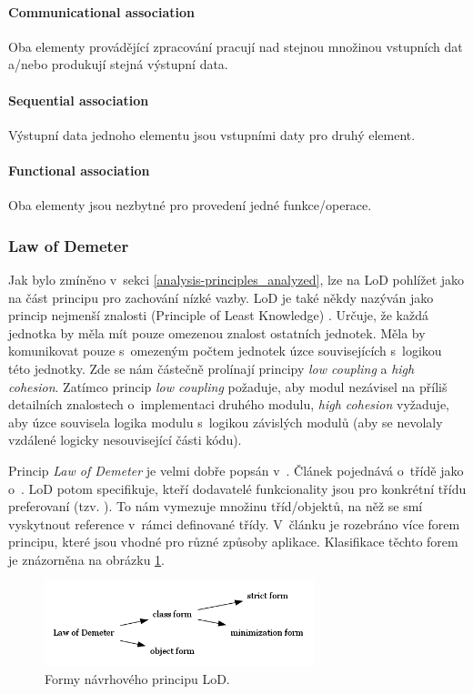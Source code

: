 \paragraph{Communicational association} Oba elementy provádějící zpracování pracují nad stejnou množinou vstupních dat a/nebo produkují stejná výstupní data.

\paragraph{Sequential association} Výstupní data jednoho elementu jsou vstupními daty pro druhý element.

\paragraph{Functional association} Oba elementy jsou nezbytné pro provedení jedné funkce/operace.

\subsubsection{Law of Demeter}
Jak bylo zmíněno v~sekci \ref{analysis-principles_analyzed}, lze na LoD pohlížet jako na část principu pro zachování nízké vazby. LoD je také někdy nazýván jako princip nejmenší znalosti (Principle of Least Knowledge) \cite{wiki:lod}. Určuje, že každá jednotka by měla mít pouze omezenou znalost ostatních jednotek. Měla by komunikovat pouze s~omezeným počtem jednotek úzce souvisejících s~logikou této jednotky. Zde se nám částečně prolínají principy \emph{low coupling} a \emph{high cohesion}. Zatímco princip \emph{low coupling} požaduje, aby modul nezávisel na příliš detailních znalostech o~implementaci druhého modulu, \emph{high cohesion} vyžaduje, aby úzce souvisela logika modulu s~logikou závislých modulů (aby se nevolaly vzdálené logicky nesouvisející části kódu).

Princip \emph{Law of Demeter} je velmi dobře popsán v~\cite{35588}. Článek pojednává o~třídě jako o~. LoD potom specifikuje, kteří dodavatelé funkcionality jsou pro konkrétní třídu preferovaní (tzv. ). To nám vymezuje množinu tříd/objektů, na něž se smí vyskytnout reference v~rámci definované třídy. V~článku je rozebráno více forem principu, které jsou vhodné pro různé způsoby aplikace. Klasifikace těchto forem je znázorněna na obrázku \ref{demeter_law_types}.

\begin{figure}[h!]
  \centering
  \includegraphics[width=0.7\textwidth]{./graphs/demeter_law_types.png}
  \caption{Formy návrhového principu LoD.\label{demeter_law_types}}
\end{figure}

